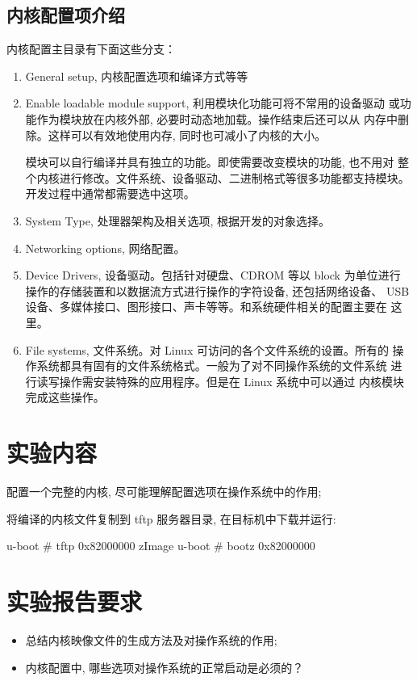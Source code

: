 \subsection{内核配置项介绍}
内核配置主目录有下面这些分支：
\begin{enumerate}
    \item General setup, 内核配置选项和编译方式等等
    \item Enable loadable module support, 利用模块化功能可将不常用的设备驱动
        或功能作为模块放在内核外部, 必要时动态地加载。操作结束后还可以从
        内存中删除。这样可以有效地使用内存, 同时也可减小了内核的大小。

        模块可以自行编译并具有独立的功能。即使需要改变模块的功能, 也不用对
        整个内核进行修改。文件系统、设备驱动、二进制格式等很多功能都支持模块。
        开发过程中通常都需要选中这项。
    \item System Type, 处理器架构及相关选项, 根据开发的对象选择。
    \item Networking options, 网络配置。
    \item Device Drivers, 设备驱动。包括针对硬盘、CDROM 等以 block 为单位进行
        操作的存储装置和以数据流方式进行操作的字符设备, 还包括网络设备、
        USB设备、多媒体接口、图形接口、声卡等等。和系统硬件相关的配置主要在
        这里。
    \item File systems, 文件系统。对 Linux 可访问的各个文件系统的设置。所有的
        操作系统都具有固有的文件系统格式。一般为了对不同操作系统的文件系统
        进行读写操作需安装特殊的应用程序。但是在 Linux 系统中可以通过
        内核模块完成这些操作。
\end{enumerate}

\section{实验内容}
配置一个完整的内核, 尽可能理解配置选项在操作系统中的作用;

将编译的内核文件复制到 tftp 服务器目录, 在目标机中下载并运行:

\begin{blockcode}
u-boot # tftp 0x82000000 zImage
u-boot # bootz 0x82000000
\end{blockcode}

\section{实验报告要求}
\begin{itemize}
    \item 总结内核映像文件的生成方法及对操作系统的作用;
    \item 内核配置中, 哪些选项对操作系统的正常启动是必须的？
\end{itemize}
